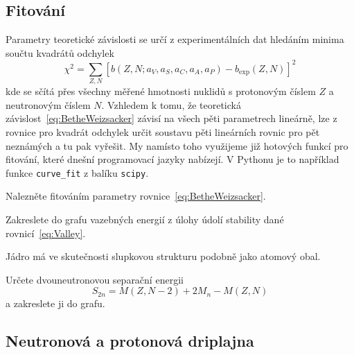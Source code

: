 \documentclass[a4paper,12pt,oneside]{article}
\def\code#1{\textnormal{\texttt{#1}}}
\theoremstyle{red}
\begin{document}
    \subsection{Fitování}
    Parametry teoretické závislosti se určí z experimentálních dat hledáním minima součtu kvadrátů odchylek
    \begin{equation}
        \chi^{2}=\sum_{Z,N}\left[b(Z,N;a_{V},a_{S},a_{C},a_{A},a_{P})-b_{\mathrm{exp}}(Z,N)\right]^{2}
    \end{equation}
    kde se sčítá přes všechny měřené hmotnosti nuklidů s protonovým číslem $Z$ a neutronovým číslem $N$.
    Vzhledem k tomu, že teoretická závislost~\eqref{eq:BetheWeizsacker} závisí na všech pěti parametrech lineárně, lze z rovnice pro kvadrát odchylek určit soustavu pěti lineárních rovnic pro pět neznámých a tu pak vyřešit.
    My namísto toho využijeme již hotových funkcí pro fitování, které dnešní programovací jazyky nabízejí.
    V Pythonu je to například funkce \code{curve\_fit} z balíku \code{scipy}.

    \begin{task}
        Nalezněte fitováním parametry rovnice~\eqref{eq:BetheWeizsacker}.
    \end{task}

    \begin{task}
        Zakreslete do grafu vazebných energií z úlohy údolí stability dané rovnicí~\eqref{eq:Valley}.
    \end{task}

    Jádro má ve skutečnosti slupkovou strukturu podobně jako atomový obal.

\begin{task}
    Určete dvouneutronovou separační energii
    \begin{equation}
        S_{2n}=M(Z,N-2)+2M_{n}-M(Z,N)
    \end{equation}
    a zakreslete ji do grafu.
\end{task}


\subsection{Neutronová a protonová driplajna}
\end{document}

